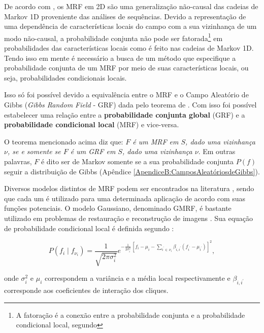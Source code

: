 {{De acordo com , os \acs{MRF} em \acs{2D} são uma generalização não-causal das cadeias de Markov \acs{1D} proveniente das análises de sequências. Devido a representação de uma dependência de características locais do campo com a sua vizinhança de um modo não-causal, a probabilidade conjunta não pode ser fatorada\footnote{A fatoração é a conexão entre a probabilidade conjunta e a probabilidade condicional local, segundo } em probabilidades das características locais como é feito nas cadeias de Markov \acs{1D}. Tendo isso em mente é necessário a busca de um método que especifique a probabilidade conjunta de um \acs{MRF} por meio de suas características locais, ou seja, probabilidades condicionais locais. 

Isso só foi possível devido a equivalência entre o \acs{MRF} e o Campo Aleatório de Gibbs (\textit{Gibbs Random Field} - \acs{GRF}) dada pelo teorema de . Com isso foi possível estabelecer uma relação entre a \textbf{probabilidade conjunta global} (\acs{GRF}) e a \textbf{probabilidade condicional local} (\acs{MRF}) e vice-versa.  

O teorema mencionado acima diz que: \textit{$F$ é um \acs{MRF} em $S$, dado uma vizinhança $\nu$, se e somente se $F$ é um \acs{GRF} em $S$, dado uma vizinhança $\nu$}. Em outras palavras, $F$ é dito ser de Markov somente se a sua probabilidade conjunta $P(f)$ seguir a distribuição de Gibbs (Apêndice \ref{ApendiceB:CamposAleatóriosdeGibbs}).

Diversos modelos distintos de \acs{MRF} podem ser encontrados na literatura \cite{li2009markov,won2013stochastic}, sendo que cada um é utilizado para uma determinada aplicação de acordo com suas funções potenciais. O modelo Gaussiano, denominado \ac{GMRF}, é bastante utilizado em problemas de restauração e reconstrução de imagens \cite{salvadeo2016nonlocal,xu2015statistical,jeng1991compound}. Sua equação de probabilidade condicional local é definida segundo :

\begin{equation}
P(f_{i} \mid f_{\nu_{i}}) = \dfrac{1}{\sqrt{2 \pi \sigma^{2}_{i}}}  e^{-\frac{1}{2\sigma^{2}_{i}} \, [f_{i}-\mu_{i}-\sum_{i^{'}\in \,\nu_{i}}^{} \beta_{i,i^{'}}(f_{i^{'}} - \mu_{i^{'}}) ]^{2} },
\label{eq:eqCap3GMRF1}
\end{equation} 

\noindent onde $\sigma^{2}_{i}$ e $\mu_{i}$ correspondem a variância e a média local respectivamente e $\beta_{i,i^{'}}$ corresponde aos coeficientes de interação dos cliques. 

}}
